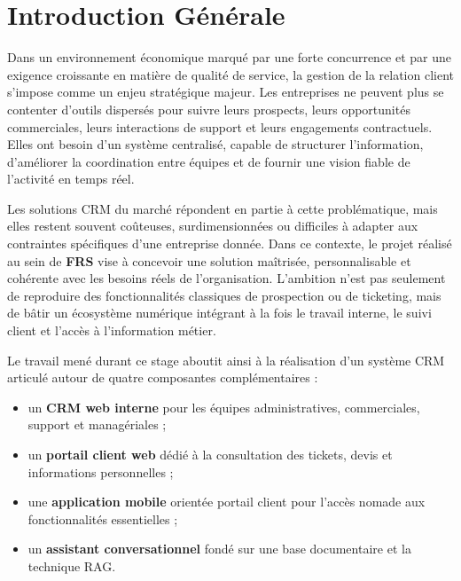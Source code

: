 \chapter*{Introduction Générale}
\adjustmtc
\thispagestyle{MyStyle}

Dans un environnement économique marqué par une forte concurrence et par une exigence croissante en matière de qualité de service, la gestion de la relation client s'impose comme un enjeu stratégique majeur. Les entreprises ne peuvent plus se contenter d'outils dispersés pour suivre leurs prospects, leurs opportunités commerciales, leurs interactions de support et leurs engagements contractuels. Elles ont besoin d'un système centralisé, capable de structurer l'information, d'améliorer la coordination entre équipes et de fournir une vision fiable de l'activité en temps réel.\par
\vspace{0.3cm}

Les solutions CRM du marché répondent en partie à cette problématique, mais elles restent souvent coûteuses, surdimensionnées ou difficiles à adapter aux contraintes spécifiques d'une entreprise donnée. Dans ce contexte, le projet réalisé au sein de \textbf{FRS} vise à concevoir une solution maîtrisée, personnalisable et cohérente avec les besoins réels de l'organisation. L'ambition n'est pas seulement de reproduire des fonctionnalités classiques de prospection ou de ticketing, mais de bâtir un écosystème numérique intégrant à la fois le travail interne, le suivi client et l'accès à l'information métier.\par
\vspace{0.3cm}

Le travail mené durant ce stage aboutit ainsi à la réalisation d'un système CRM articulé autour de quatre composantes complémentaires :
\begin{itemize}
    \item un \textbf{CRM web interne} pour les équipes administratives, commerciales, support et managériales ;
    \item un \textbf{portail client web} dédié à la consultation des tickets, devis et informations personnelles ;
    \item une \textbf{application mobile} orientée portail client pour l'accès nomade aux fonctionnalités essentielles ;
    \item un \textbf{assistant conversationnel} fondé sur une base documentaire et la technique RAG.
\end{itemize}

